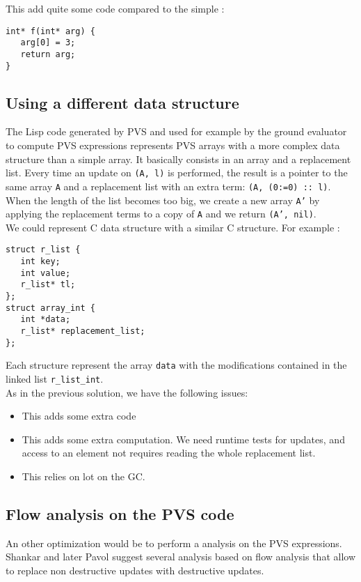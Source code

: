 \documentclass[12pt,a4paper]{article}
\newcommand{\cl}[1]{\texttt{#1}}
\begin{document}
This add quite some code compared to the simple :

\begin{lstlisting}
int* f(int* arg) {
   arg[0] = 3;
   return arg;
}
\end{lstlisting}




\subsection{Using a different data structure}

The Lisp code generated by PVS and used for example by the ground evaluator to compute PVS expressions represents PVS arrays with a more complex data structure than a simple array. It basically consists in an array and a replacement list. Every time an update on \cl{(A, l)} is performed, the result is a pointer to the same array \cl{A} and a replacement list with an extra term: \cl{(A, (0:=0) :: l)}. When the length of the list becomes too big, we create a new array \cl{A'} by applying the replacement terms to a copy of \cl{A} and we return \cl{(A', nil)}.\\

We could represent C data structure with a similar C structure. For example :
\begin{lstlisting}
struct r_list {
   int key;
   int value;
   r_list* tl;
};
struct array_int {
   int *data;
   r_list* replacement_list;
};
\end{lstlisting}

Each structure represent the array \cl{data} with the modifications contained in the linked list \cl{r\_list\_int}.\\

As in the previous solution, we have the following issues:
\begin{itemize}
\item This adds some extra code
\item This adds some extra computation. We need runtime tests for updates, and access to an element not requires reading the whole replacement list.
\item This relies on lot on the GC.
\end{itemize}


\subsection{Flow analysis on the PVS code}

An other optimization would be to perform a analysis on the PVS expressions. Shankar \cite{shankar02} and later Pavol \cite{pavol} suggest several analysis based on flow analysis that allow to replace non destructive updates with destructive updates.\\
\end{document}
